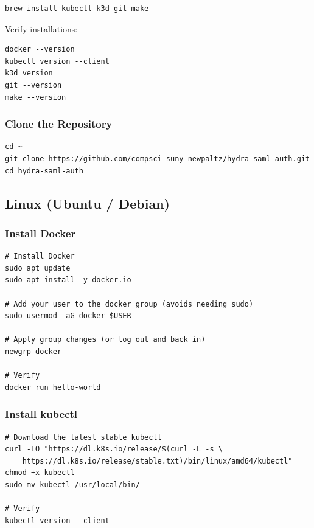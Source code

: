 \documentclass[11pt,a4paper]{article}
\begin{document}
\begin{lstlisting}[style=bash]
brew install kubectl k3d git make
\end{lstlisting}

Verify installations:

\begin{lstlisting}[style=bash]
docker --version
kubectl version --client
k3d version
git --version
make --version
\end{lstlisting}

\subsubsection{Clone the Repository}

\begin{lstlisting}[style=bash]
cd ~
git clone https://github.com/compsci-suny-newpaltz/hydra-saml-auth.git
cd hydra-saml-auth
\end{lstlisting}

\subsection{Linux (Ubuntu / Debian)}
\label{sec:prereq-linux}

\subsubsection{Install Docker}

\begin{lstlisting}[style=bash]
# Install Docker
sudo apt update
sudo apt install -y docker.io

# Add your user to the docker group (avoids needing sudo)
sudo usermod -aG docker $USER

# Apply group changes (or log out and back in)
newgrp docker

# Verify
docker run hello-world
\end{lstlisting}

\subsubsection{Install kubectl}

\begin{lstlisting}[style=bash]
# Download the latest stable kubectl
curl -LO "https://dl.k8s.io/release/$(curl -L -s \
    https://dl.k8s.io/release/stable.txt)/bin/linux/amd64/kubectl"
chmod +x kubectl
sudo mv kubectl /usr/local/bin/

# Verify
kubectl version --client
\end{lstlisting}
\end{document}
